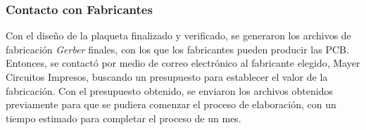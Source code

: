 \subsubsection{Contacto con Fabricantes}
 
Con el diseño de la plaqueta finalizado y verificado, se generaron los archivos de fabricación \textit{Gerber} finales, con los que los fabricantes pueden producir las PCB. Entonces, se contactó por medio de correo electrónico al fabricante elegido, Mayer Circuitos Impresos, buscando un presupuesto para establecer el valor de la fabricación. Con el presupuesto obtenido, se enviaron los archivos obtenidos previamente para que se pudiera comenzar el proceso de elaboración, con un tiempo estimado para completar el proceso de un mes.\\